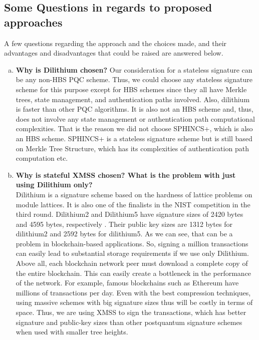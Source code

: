 \subsection{Some Questions in regards to proposed approaches}
A few questions regarding the approach and the choices made, and their advantages and disadvantages
that could be raised are answered below.
\begin{enumerate}[a.]
    \item \textbf{Why is Dilithium chosen?} Our consideration for a stateless signature can be any non-HBS PQC scheme.
    Thus, we could choose any stateless signature scheme for this purpose except for HBS schemes since they all have Merkle trees, state management, and authentication paths involved.
    Also, dilithium is faster than other PQC algorithms.
    It is also not an HBS scheme and, thus, does not involve any state management or authentication path computational complexities.
    That is the reason we did not choose SPHINCS+, which is also an HBS scheme. 
    SPHINCS+ is a stateless signature scheme but is still based on Merkle Tree Structure, which has its complexities of authentication path computation etc.
    
    \item \textbf{Why is stateful XMSS chosen? What is the problem with just using Dilithium only?} \\
    Dilithium is a signature scheme based on the hardness of lattice problems on module lattices.
    It is also one of the finalists in the NIST competition in the third round.
    Dilithium2 and Dilithium5 have signature sizes of 2420 bytes and 4595 bytes, respectively \cite{stebilaPostquantumKeyExchange2017}.
    Their public key sizes are 1312 bytes for dilithium2 and 2592 bytes for dilithium5.
    As we can see, that can be a problem in blockchain-based applications.
    So, signing a million transactions can easily lead to substantial storage requirements if we use only Dilithium.
    Above all, each blockchain network peer must download a complete copy of the entire blockchain.
    This can easily create a bottleneck in the performance of the network.
    For example, famous blockchains such as Ethereum have millions of transactions per day.
    Even with the best compression techniques, using massive schemes with big signature sizes thus will be costly in terms of space.
    Thus, we are using XMSS to sign the transactions, which has better signature and public-key sizes than other postquantum signature schemes when used with smaller tree heights.
    

\end{enumerate}
